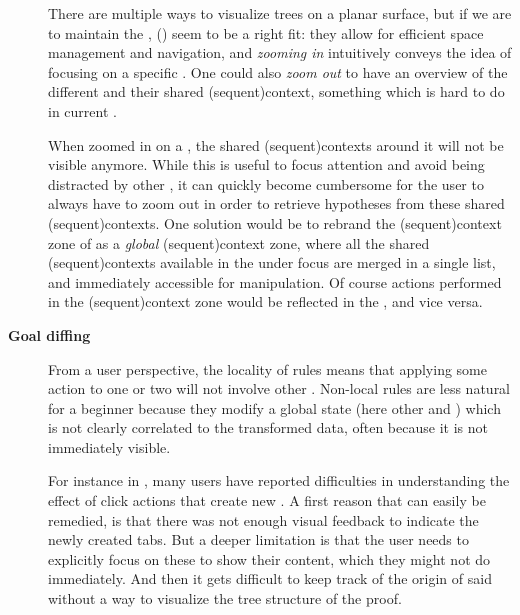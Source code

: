 \begin{scope}
\begin{description}
    There are multiple ways to visualize trees on a planar surface, but if we
    are to maintain the  ,  () seem to be a right fit: they allow for efficient
    space management and navigation, and \emph{zooming in} intuitively conveys
    the idea of focusing on a specific . One could also \emph{zoom
    out} to have an overview of the different  and their shared
    \kl(sequent){context}, something which is hard to do in current .
    
    When zoomed in on a , the shared \kl(sequent){contexts} around
    it will not be visible anymore. While this is useful to focus attention and
    avoid being distracted by other , it can quickly become
    cumbersome for the user to always have to zoom out in order to retrieve
    hypotheses from these shared \kl(sequent){contexts}. One solution would be
    to rebrand the \kl(sequent){context} zone of  as a \emph{global}
    \kl(sequent){context} zone, where all the shared \kl(sequent){contexts}
    available in the  under focus are merged in a single list, and
    immediately accessible for manipulation. Of course actions performed in the
    \kl(sequent){context} zone would be reflected in the , and
    vice versa.

  \item[\textbf{Goal diffing}] From a user perspective, the locality of rules
    means that applying some action to one or two  will not involve
    other . Non-local rules are less natural
    for a beginner because they modify a global state (here other  and
    ) which is not clearly correlated to the transformed data,
    often because it is not immediately visible.

    For instance in , many users have reported difficulties in
    understanding the effect of click actions that create new . A first
    reason that can easily be remedied, is that there was not enough visual
    feedback to indicate the newly created tabs. But a deeper limitation is that
    the user needs to explicitly focus on these  to show their content,
    which they might not do immediately. And then it gets difficult to keep
    track of the origin of said  without a way to visualize the tree
    structure of the proof.


\end{description}
\end{scope}
